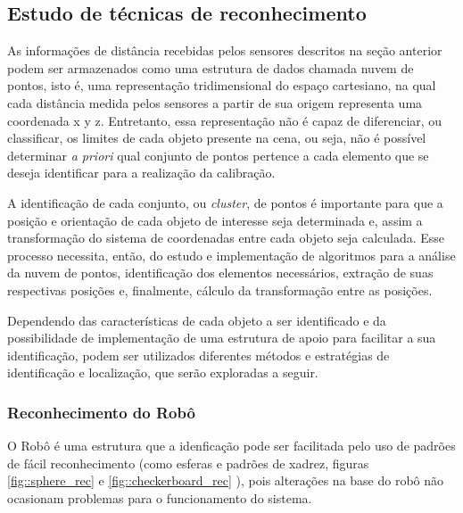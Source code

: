 \subsection{Estudo de técnicas de reconhecimento} 

As informações de distância recebidas pelos sensores descritos na seção
anterior podem ser armazenados como uma estrutura de dados chamada nuvem de
pontos, isto é, uma representação tridimensional do espaço cartesiano, na qual cada distância medida pelos
sensores a partir de sua origem representa uma coordenada x y z.
Entretanto, essa representação não é capaz de diferenciar, ou classificar, os
limites de cada objeto presente na cena, ou seja, não é possível determinar
\textit{a priori} qual conjunto de pontos pertence a cada elemento que se deseja
identificar para a realização da calibração.

A identificação de cada conjunto, ou \textit{cluster}, de pontos é importante
para que a posição e orientação de cada objeto de interesse seja determinada e,
assim a transformação do sistema de coordenadas entre cada objeto seja
calculada. Esse processo necessita, então, do estudo e implementação de
algoritmos para a análise da nuvem de pontos, identificação dos elementos
necessários, extração de suas respectivas posições e, finalmente, cálculo da
transformação entre as posições. 

Dependendo das características de cada objeto a ser identificado e da
possibilidade de implementação de uma estrutura de apoio para facilitar a sua
identificação, podem ser utilizados diferentes métodos e estratégias de
identificação e localização, que serão exploradas a seguir.

\subsubsection{Reconhecimento do Robô}

O Robô é uma estrutura que a idenficação pode ser facilitada pelo uso de
padrões de fácil reconhecimento (como esferas e padrões de xadrez, figuras
\ref{fig::sphere_rec} e \ref{fig::checkerboard_rec} ), pois alterações na base
do robô não ocasionam problemas para o funcionamento do sistema.


